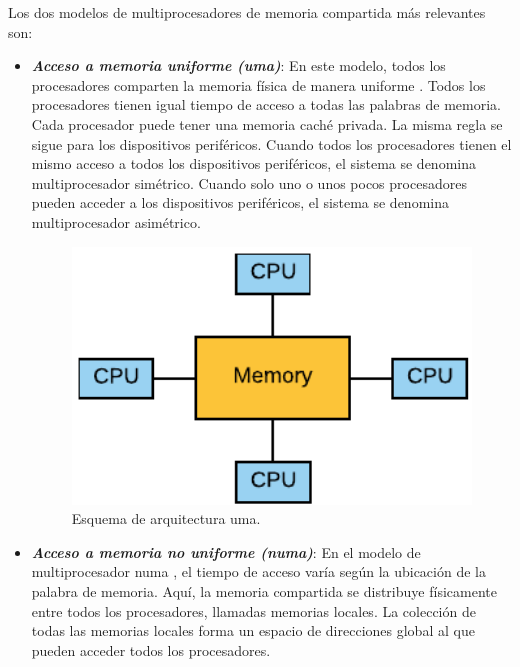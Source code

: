 Los dos modelos de multiprocesadores de memoria compartida más relevantes son:

\begin{itemize}
    \item \textbf{\textit{Acceso a memoria uniforme (\acrshort{uma})}}: En este modelo, todos los procesadores comparten la memoria física de manera uniforme \cite{rogers2013amd}. Todos los procesadores tienen igual tiempo de acceso a todas las palabras de memoria. Cada procesador puede tener una memoria caché privada. La misma regla se sigue para los dispositivos periféricos. Cuando todos los procesadores tienen el mismo acceso a todos los dispositivos periféricos, el sistema se denomina multiprocesador simétrico. Cuando solo uno o unos pocos procesadores pueden acceder a los dispositivos periféricos, el sistema se denomina multiprocesador asimétrico.
    
\vspace{0.35cm}
\begin{figure}[h]
 	\centering
 	\includegraphics[width=11.5cm]{figures/UMA}
 	\caption{Esquema de arquitectura \acrshort{uma}.}
 	\label{fig:chap2:UMA}
\end{figure}
\vspace{0.35cm}
    
    \item \textbf{\textit{Acceso a memoria no uniforme (\acrshort{numa})}}: En el modelo de multiprocesador \acrshort{numa} \cite{numa}, el tiempo de acceso varía según la ubicación de la palabra de memoria. Aquí, la memoria compartida se distribuye físicamente entre todos los procesadores, llamadas memorias locales. La colección de todas las memorias locales forma un espacio de direcciones global al que pueden acceder todos los procesadores.


\end{itemize}
